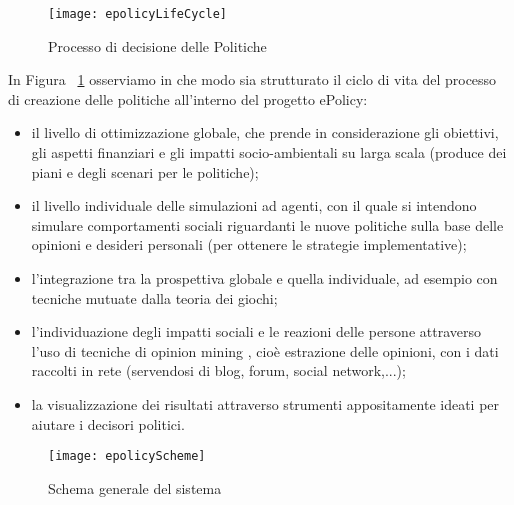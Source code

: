 \documentclass[12pt,a4paper,openright,twoside]{report}
\begin{document}
\begin{figure}[hbt]
	\centering
	\texttt{[image: epolicyLifeCycle]}
	\caption{Processo di decisione delle Politiche}
	\label{epolicyLifeCycle}
\end{figure}

In Figura ~\ref{epolicyLifeCycle} osserviamo in che modo sia strutturato il ciclo di vita del processo di creazione delle politiche all'interno del progetto ePolicy: \begin{itemize}
\item il livello di ottimizzazione globale, che prende in considerazione gli obiettivi, gli aspetti finanziari e gli impatti socio-ambientali su larga scala (produce dei piani e degli scenari per le politiche);
\item il livello individuale delle simulazioni ad agenti, con il quale si intendono simulare  comportamenti sociali riguardanti le nuove politiche sulla base delle opinioni e desideri personali (per ottenere le strategie implementative);
\item  l'integrazione tra la prospettiva globale e quella individuale, ad esempio con tecniche mutuate dalla teoria dei giochi;
\item l'individuazione degli impatti sociali e le reazioni delle persone attraverso l'uso di tecniche di opinion mining , cioè estrazione delle opinioni, con i dati raccolti in rete (servendosi di blog, forum, social network,...);
\item la visualizzazione dei risultati attraverso strumenti appositamente ideati per aiutare i decisori politici.
\end{itemize}


\begin{figure}[hbt]
	\centering
	\texttt{[image: epolicyScheme]}
	\caption{Schema generale del sistema}
	\label{epolicyScheme}
\end{figure}
\end{document}
